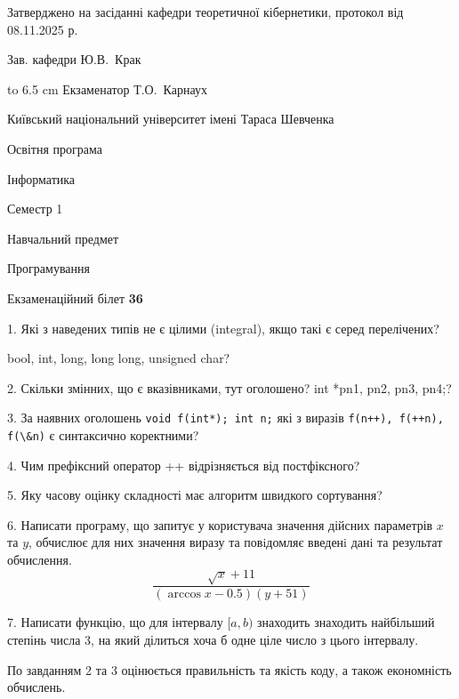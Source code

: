 \documentclass[12pt, ukrainian]{article}
\def\code#1{\Verb!#1!}
\begin{document}
{\smallskip\smallskip \begin {scriptsize} Затверджено на засіданні кафедри теоретичної кібернетики, протокол   від   08.11.2025 р.\par\smallskip\smallskip\smallskip\smallskip
{\parbox {6.5 cm} {Зав. кафедри \dotfill Ю.В.~Крак}}\hspace {0.7cm} {\hbox to 6.5 cm { Екзаменатор \dotfill Т.О.~Карнаух}} \end{scriptsize}}
\vspace{0.9cm}
{{\begin {scriptsize}\par
{ \center  Київський національний університет імені Тараса Шевченка \par}
{\parbox {5 cm}{Освітня програма \hfill}{\parbox {7 cm}{Інформатика\hfill}}\parbox {6 cm}{\hfill Семестр 1}}\par
{\parbox {5 cm} {Навчальний предмет \hfill}\parbox {7 cm}{Програмування \hfill}\parbox {6cm}{\hfill}\par}\vspace{-15pt} \end{scriptsize}}{\center Екзаменаційний білет \No \textbf { 36 }\par}}
{%
1. Які з наведених типів не є цілими (integral), якщо такі є серед перелічених?

bool, int, long, long long, unsigned char?
\par
\vspace{2mm}
2. Скільки змінних, що є вказівниками, тут оголошено?
int *pn1, pn2, pn3, pn4;?
\par
\vspace{2mm}
3. За наявних оголошень \code{void f(int*); int n;} які з виразів \code{f(n++), f(++n), f(\&n)} є синтаксично коректними?
\par
\vspace{2mm}
4. Чим префіксний оператор ++ відрізняється від постфіксного?
\par
\vspace{2mm}
5. Яку часову оцінку складності має алгоритм швидкого сортування?
\par
\vspace{2mm}
6. Написати програму, що запитує у користувача значення дійсних параметрів $x$ та $y$, обчислює для них значення виразу та повiдомляє введенi данi та результат обчислення.
$$\frac{\sqrt x + 11}{(\arccos x - 0.5) (y + 51)}$$ 

\par
7. Написати функцію, що для інтервалу $[a, b)$ знаходить знаходить найбільший степінь числа 3, на який ділиться хоча б одне ціле число з цього інтервалу.

По завданням 2 та 3 оцінюється правильність та якість коду, а також економність обчислень.

}
\end{document}
